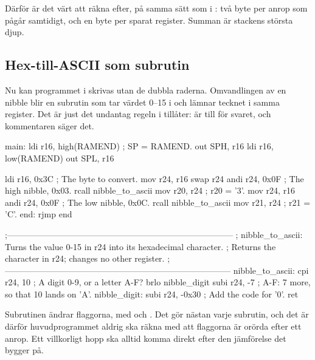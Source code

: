 Därför är det värt att räkna efter, på samma sätt som i : två byte per anrop som
pågår samtidigt, och en byte per sparat register. Summan är stackens största djup.

\subsection{Hex-till-ASCII som subrutin}
\label{c10:c9}
Nu kan programmet i  skrivas utan de dubbla raderna. Omvandlingen av en nibble blir
en subrutin som tar värdet 0--15 i  och lämnar tecknet i samma register. Det är just det
undantag regeln i  tillåter:  är till för svaret, och kommentaren säger
det.

\begin{asmcode}
main:
    ldi r16, high(RAMEND)           ; SP = RAMEND.
    out SPH, r16
    ldi r16, low(RAMEND)
    out SPL, r16

    ldi r16, 0x3C                   ; The byte to convert.
    mov r24, r16
    swap r24
    andi r24, 0x0F                  ; The high nibble, 0x03.
    rcall nibble_to_ascii
    mov r20, r24                    ; r20 = '3'.
    mov r24, r16
    andi r24, 0x0F                  ; The low nibble, 0x0C.
    rcall nibble_to_ascii
    mov r21, r24                    ; r21 = 'C'.
end:
    rjmp end

;--------------------------------------------------------------------------------
; nibble_to_ascii: Turns the value 0-15 in r24 into its hexadecimal character.
; Returns the character in r24; changes no other register.
;--------------------------------------------------------------------------------
nibble_to_ascii:
    cpi r24, 10                     ; A digit 0-9, or a letter A-F?
    brlo nibble_digit
    subi r24, -7                    ; A-F: 7 more, so that 10 lands on 'A'.
nibble_digit:
    subi r24, -0x30                 ; Add the code for '0'.
    ret
\end{asmcode}

\noindent Subrutinen ändrar flaggorna, med  och . Det gör nästan varje
subrutin, och det är därför huvudprogrammet aldrig ska räkna med att flaggorna är orörda efter ett
anrop. Ett villkorligt hopp ska alltid komma direkt efter den jämförelse det bygger på.
